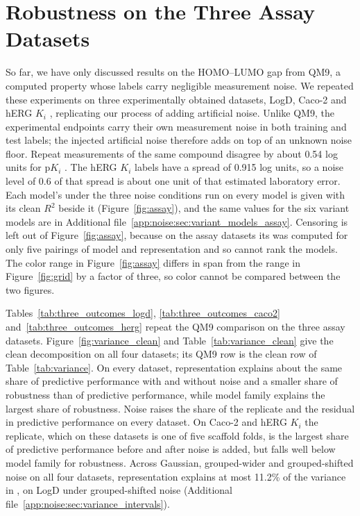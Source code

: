 \section{Robustness on the Three Assay Datasets}

So far, we have only discussed results on the HOMO--LUMO gap from QM9, a computed property whose labels carry negligible measurement noise. We repeated these experiments on three experimentally obtained datasets, LogD, Caco-2 \citep{openadmet} and hERG $K_i$ \citep{Zdrazil2023}, replicating our process of adding artificial noise. Unlike QM9, the experimental endpoints carry their own measurement noise in both training and test labels; the injected artificial noise therefore adds on top of an unknown noise floor. Repeat measurements of the same compound disagree by about 0.54 log units for p$K_i$ \citep{Kalliokoski2013, Kramer2012}. The hERG $K_i$ labels have a spread of 0.915 log units, so a noise level of 0.6 of that spread is about one unit of that estimated laboratory error. Each model's \aucnorm{} under the three noise conditions run on every model is given with its clean $R^2$ beside it (Figure~\ref{fig:assay}), and the same values for the six variant models are in Additional file~\ref{app:noise:sec:variant_models_assay}. Censoring is left out of Figure~\ref{fig:assay}, because on the assay datasets its \aucnorm{} was computed for only five pairings of model and representation and so cannot rank the models. The color range in Figure~\ref{fig:assay} differs in span from the range in Figure~\ref{fig:grid} by a factor of three, so color cannot be compared between the two figures.

Tables~\ref{tab:three_outcomes_logd}, \ref{tab:three_outcomes_caco2} and~\ref{tab:three_outcomes_herg} repeat the QM9 comparison on the three assay datasets. Figure~\ref{fig:variance_clean} and Table~\ref{tab:variance_clean} give the clean decomposition on all four datasets; its QM9 row is the clean row of Table~\ref{tab:variance}. On every dataset, representation explains about the same share of predictive performance with and without noise and a smaller share of robustness than of predictive performance, while model family explains the largest share of robustness. Noise raises the share of the replicate and the residual in predictive performance on every dataset. On Caco-2 and hERG $K_i$ the replicate, which on these datasets is one of five scaffold folds, is the largest share of predictive performance before and after noise is added, but falls well below model family for robustness. Across Gaussian, grouped-wider and grouped-shifted noise on all four datasets, representation explains at most 11.2\% of the variance in \aucnorm{}, on LogD under grouped-shifted noise (Additional file~\ref{app:noise:sec:variance_intervals}).

